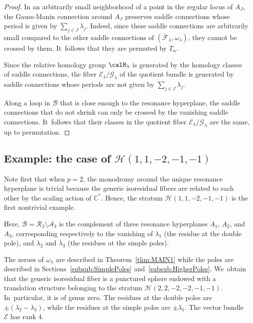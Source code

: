\begin{proof}
In an arbitrarily small neighborhood of a point in the regular locus of $A_{J}$, the Gauss-Manin connection around $A_{J}$ preserves saddle connections whose period is given by $\sum_{j \in J} \lambda_{j}$. Indeed, since these saddle connections are arbitrarily small compared to the other saddle connections of $(\overline{\mathcal{F}}_{\lambda},\omega_{\lambda})$, they cannot be crossed by them. It~follows that they are permuted by $T_{\alpha}$.

Since the relative homology group $\calH_{\lambda}$ is generated by the homology classes of saddle connections, the fiber $\mathcal{E}_{\lambda}/\mathcal{G}_{\lambda}$ of the quotient bundle is generated by saddle connections whose periods are not given by $\sum_{j \in J} \lambda_{j}$.

Along a loop in $\mathcal{B}$ that is close enough to the resonance hyperplane, the saddle connections that do not shrink can only be crossed by the vanishing saddle connections. It~follows that their classes in the quotient fiber $\mathcal{E}_{\lambda}/\mathcal{G}_{\lambda}$ are the same, up to permutation.
\end{proof}

\subsection{Example: the case of $\mathcal{H}(1,1,-2,-1,-1)$}\label{sub:monoExample}

Note first that when $p=2$, the monodromy around the unique resonance hyperplane is trivial because the generic isoresidual fibers are related to each other by the scaling action of $\mathbb{C}^{\ast}$. Hence, the stratum $\mathcal{H}(1,1,-2,-1,-1)$ is the first nontrivial example.

Here, $\mathcal{B} = \mathcal{R}_{3} \setminus \mathcal{A}_{3}$ is the complement of three resonance hyperplanes $A_{1}$, $A_{2}$, and~$A_{3}$, corresponding respectively to the vanishing of $\lambda_{1}$ (the residue at the double pole), and $\lambda_{2}$ and $\lambda_{3}$ (the residues at the simple poles).

The zeroes of $\omega_{\lambda}$ are described in Theorem~\ref{thm:MAIN1} while the poles are described in Sections~\ref{subsub:SimplePoles} and~\ref{subsub:HigherPoles}. We~obtain that the generic isoresidual fiber is a punctured sphere endowed with a translation structure belonging to the stratum $\mathcal{H}(2,2,-2,-2,-1,-1)$. In~particular, it is of genus zero. The residues at the double poles are $\pm (\lambda_{2}-\lambda_{3})$, while the residues at the simple poles are $\pm\lambda_{1}$. The vector bundle $\mathcal{E}$ has rank $4$.

